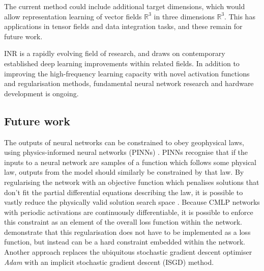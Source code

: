 The current method could include additional target dimensions, which would allow representation learning of vector fields \(\mathbb{R}^{3}\) in three dimensions \(\mathbb{R}^{3}\).
This has applications in tensor fields and data integration tasks, and these remain for future work.

INR is a rapidly evolving field of research, and draws on contemporary established deep learning improvements within related fields.
In addition to improving the high-frequency learning capacity with novel activation functions and regularisation methods, fundamental neural network research and hardware development is ongoing.




\subsection{Future work}
\label{sec:future}
The outputs of neural networks can be constrained to obey geophysical laws, using physics-informed neural networks (PINNs) \parencite{raissiPhysicsinformedNeuralNetworks2019}.
PINNs recognise that if the inputs to a neural network are samples of a function which follows some physical law, outputs from the model should similarly be constrained by that law.
By regularising the network with an objective function which penalises solutions that don't fit the partial differential equations describing the law, it is possible to vastly reduce the physically valid solution search space \parencite{raissiPhysicsinformedNeuralNetworks2019}.
Because CMLP networks with periodic activations are continuously differentiable, it is possible to enforce this constraint as an element of the overall loss function within the network.
\Textcite{sethiHardEnforcementPhysicsinformed2023} demonstrate that this regularisation does not have to be implemented as a loss function, but instead can be a hard constraint embedded within the network.
Another approach \parencite{liImplicitStochasticGradient2023} replaces the ubiquitous stochastic gradient descent optimiser \emph{Adam} with an implicit stochastic gradient descent (ISGD) method.

